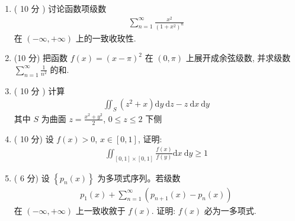 \documentclass[space]{ctexart} %
\def\geq{\geqslant}
\def\leq{\leqslant}
\begin{document}
\begin{enumerate}[itemsep=1.2em,label=\arabic*.,topsep=0pt,left=0em]
\item  ( 10 分  )  讨论函数项级数
\begin{align*}
\sum_{n=1}^{\infty} \frac{x^{2}}{\left(1+x^{2}\right)^{n}}
\end{align*}
在 $ (-\infty,+\infty) $ 上的一致收玫性.

\item  (10 分) 把函数 $f(x)=(x-\pi)^{2}$ 在 $(0, \pi)$ 上展开成余弦级数, 并求级数 $\sum_{n=1}^{\infty} \frac{1}{n^{2}}$ 的和.

\item   ( 10 分  )  计算
\begin{align*}
\iint_{S}\left(z^{2}+x\right) \mathrm{d} y \mathrm{~d} z-z \mathrm{~d} x \mathrm{~d} y
\end{align*}
其中 $ S $ 为曲面 $ z=\frac{x^{2}+y^{2}}{2}$, $0 \leq z \leq 2$  下侧
\item   ( 10 分) 设  $f(x)>0$, $x \in[0,1] $, 证明:
\begin{align*}
\iint_{[0,1] \times[0,1]} \frac{f(x)}{f(y)} \mathrm{d} x \mathrm{~d} y \geq 1
\end{align*}

\item   ( 6 分) 设 $ \left\{p_{n}(x)\right\} $ 为多项式序列。若级数
\begin{align*}
p_{1}(x)+\sum_{n=1}^{\infty}\left(p_{n+1}(x)-p_{n}(x)\right)
\end{align*}
在 $ (-\infty,+\infty)$  上一致收敘于  $f(x) $.  证明: $ f(x) $ 必为一多项式.

\end{enumerate}

\clearpage	
\end{document}
